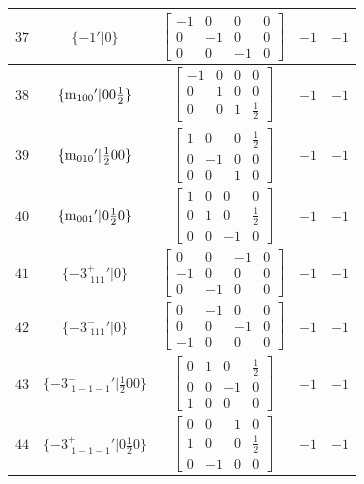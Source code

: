 \documentclass[fleqn,8pt]{jsarticle}
\begin{document}
\begin{longtable}{ccccc}
$ 37 $ & $ \{-1{}'|0\} $ & $ \begin{bmatrix} -1 & 0 & 0 & 0 \\ 0 & -1 & 0 & 0 \\ 0 & 0 & -1 & 0 \end{bmatrix} $ & $ -1 $ & $ -1 $ \\ \hline
$ 38 $ & $ \{{\rm m}_{100}{}'|0 0 \frac{1}{2}\} $ & $ \begin{bmatrix} -1 & 0 & 0 & 0 \\ 0 & 1 & 0 & 0 \\ 0 & 0 & 1 & \frac{1}{2} \end{bmatrix} $ & $ -1 $ & $ -1 $ \\ \hline
$ 39 $ & $ \{{\rm m}_{010}{}'|\frac{1}{2} 0 0\} $ & $ \begin{bmatrix} 1 & 0 & 0 & \frac{1}{2} \\ 0 & -1 & 0 & 0 \\ 0 & 0 & 1 & 0 \end{bmatrix} $ & $ -1 $ & $ -1 $ \\ \hline
$ 40 $ & $ \{{\rm m}_{001}{}'|0 \frac{1}{2} 0\} $ & $ \begin{bmatrix} 1 & 0 & 0 & 0 \\ 0 & 1 & 0 & \frac{1}{2} \\ 0 & 0 & -1 & 0 \end{bmatrix} $ & $ -1 $ & $ -1 $ \\ \hline
$ 41 $ & $ \{-3^{+}_{\,\,111}{}'|0\} $ & $ \begin{bmatrix} 0 & 0 & -1 & 0 \\ -1 & 0 & 0 & 0 \\ 0 & -1 & 0 & 0 \end{bmatrix} $ & $ -1 $ & $ -1 $ \\ \hline
$ 42 $ & $ \{-3^{-}_{\,\,111}{}'|0\} $ & $ \begin{bmatrix} 0 & -1 & 0 & 0 \\ 0 & 0 & -1 & 0 \\ -1 & 0 & 0 & 0 \end{bmatrix} $ & $ -1 $ & $ -1 $ \\ \hline
$ 43 $ & $ \{-3^{-}_{\,\,1-1-1}{}'|\frac{1}{2} 0 0\} $ & $ \begin{bmatrix} 0 & 1 & 0 & \frac{1}{2} \\ 0 & 0 & -1 & 0 \\ 1 & 0 & 0 & 0 \end{bmatrix} $ & $ -1 $ & $ -1 $ \\ \hline
$ 44 $ & $ \{-3^{+}_{\,\,1-1-1}{}'|0 \frac{1}{2} 0\} $ & $ \begin{bmatrix} 0 & 0 & 1 & 0 \\ 1 & 0 & 0 & \frac{1}{2} \\ 0 & -1 & 0 & 0 \end{bmatrix} $ & $ -1 $ & $ -1 $ \\ \hline

\end{longtable}
\end{document}
